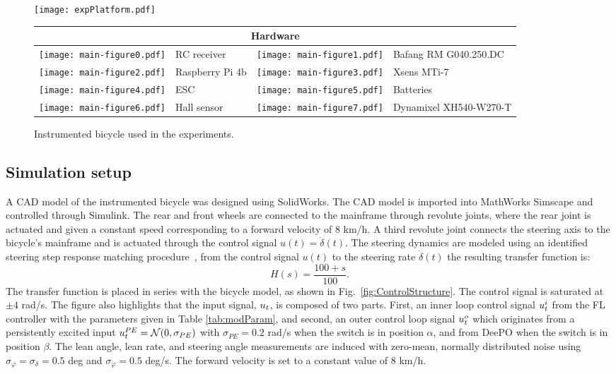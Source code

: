 \begin{figure}[t]
    \centering
    \texttt{[image: expPlatform.pdf]}
    \begin{tabular}{@{}llll@{}}
        \toprule
        \multicolumn{4}{c}{\textbf{Hardware}} \\ \midrule
        \texttt{[image: main-figure0.pdf]}   & RC receiver    
        & \texttt{[image: main-figure1.pdf]}     & Bafang RM G040.250.DC    \\
        \texttt{[image: main-figure2.pdf]}      & Raspberry Pi 4b     & 
        \texttt{[image: main-figure3.pdf]} &   Xsens MTi-7  \\
        \texttt{[image: main-figure4.pdf]}   & ESC    
        & \texttt{[image: main-figure5.pdf]}     & Batteries    \\
        \texttt{[image: main-figure6.pdf]}      & Hall sensor     & 
        \texttt{[image: main-figure7.pdf]}      & Dynamixel XH540-W270-T \\ \bottomrule
        \end{tabular}
    \caption{Instrumented bicycle used in the experiments.}
    \label{fig:expPlatform}
\end{figure}

\subsection{Simulation setup}
A CAD model of the instrumented bicycle was designed using SolidWorks. The CAD model is imported into MathWorks Simscape and controlled through Simulink. The rear and front wheels are connected to the mainframe through revolute joints, where the rear joint is actuated and given a constant speed corresponding to a forward velocity of $8$ km/h. A third revolute joint connects the steering axis to the bicycle's mainframe and is actuated through the control signal $u(t) = \dot\delta(t)$. The steering dynamics are modeled using an identified steering step response matching procedure~\cite{PerssonECC}, from the control signal $u(t)$ to the steering rate $\dot\delta(t)$ the resulting transfer function is: 
\begin{equation}
    H(s) = \frac{100+s}{100}.
\end{equation}
The transfer function is placed in series with the bicycle model, as shown in Fig.~\ref{fig:ControlStructure}. The control signal is saturated at $\pm 4$ rad/s. The figure also highlights that the input signal, $u_{t}$, is composed of two parts. First, an inner loop control signal $u_{t}^{i}$ from the FL controller with the parameters given in Table \ref{tab:modParam}, and second, an outer control loop signal $u_{t}^{o}$ which originates from a persistently excited input $u_{t}^{PE} = \mathcal{N}(0,\sigma_{PE})$ with $\sigma_{PE}=0.2$ rad/s when the switch is in position $\alpha$, and from DeePO when the switch is in position $\beta$. The lean angle, lean rate, and steering angle measurements are induced with zero-mean, normally distributed noise using $\sigma_{\varphi} = \sigma_{\delta}=0.5$ deg and $\sigma_{\dot{\varphi}} =0.5$ deg/s. The forward velocity is set to a constant value of $8$ km/h.

